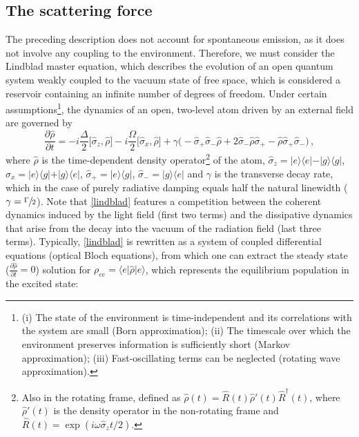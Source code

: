\documentclass[../Thesis-IJspeert.tex]{subfiles}
\begin{document}
\subsection{The scattering force}
The preceding description does not account for spontaneous emission, as it does not involve any coupling to the environment. Therefore, we must consider the Lindblad master equation, which describes the evolution of an open quantum system weakly coupled to the vacuum state of free space, which is considered a reservoir containing an infinite number of degrees of freedom. Under certain assumptions\footnote{(i) The state of the environment is time-independent and its correlations with the system are small (Born approximation); (ii) The timescale over which the environment preserves information is sufficiently short (Markov approximation); (iii) Fast-oscillating terms can be neglected (rotating wave approximation).}, the dynamics of an open, two-level atom driven by an external field are governed by
\begin{equation}
\label{lindblad}
\frac{\partial\hat{\rho}}{\partial t}=-i\frac{\Delta}{2}\big[\hat{\sigma}_z,\hat{\rho}\big]-i\frac{\Omega}{2}\big[\hat{\sigma}_x,\hat{\rho}\big] + \gamma \big(-\hat{\sigma}_+\hat{\sigma}_-\hat{\rho}+2\hat{\sigma}_-\hat{\rho}\hat{\sigma}_+-\hat{\rho}\hat{\sigma}_+\hat{\sigma}_-\big)\,,
\end{equation}
where $\hat{\rho}$ is the time-dependent density operator\footnote{Also in the rotating frame, defined as $\hat{\rho}(t)=\hat{R}(t)\hat{\rho}'(t)\hat{R}^\dagger(t)$, where $\hat{\rho}'(t)$ is the density operator in the non-rotating frame and $\hat{R}(t)=\exp(i\omega\hat{\sigma}_z t/2)$.} of the atom,
 $\hat{\sigma}_z=\vert e \rangle \langle e \vert-\vert g \rangle \langle g \vert$, $\hat{\sigma}_x=\vert e \rangle \langle g \vert+\vert g \rangle \langle e \vert$, $\hat{\sigma}_+=\vert e \rangle \langle g \vert$, $\hat{\sigma}_-=\vert g \rangle \langle e \vert$ and $\gamma$ is the transverse decay rate, which in the case of purely radiative damping equals half the natural linewidth ($\gamma=\sfrac{\Gamma}{2}$). Note that \autoref{lindblad} features a competition between the coherent dynamics induced by the light field (first two terms) and the dissipative dynamics that arise from the decay into the vacuum of the radiation field (last three terms). Typically, \autoref{lindblad} is rewritten as a system of coupled differential equations (optical Bloch equations), from which one can extract the steady state ($\frac{\partial\hat{\rho}}{\partial t}=0$) solution for ${\rho}_{ee}=\langle e \vert \hat{\rho} \vert e\rangle$, which represents the equilibrium population in the excited state:
\end{document}
